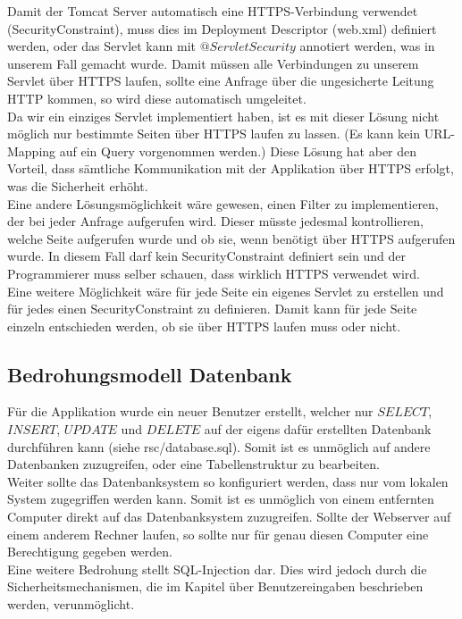 \documentclass[12pt]{scrartcl}
\begin{document}
Damit der Tomcat Server automatisch eine HTTPS-Verbindung verwendet (SecurityConstraint), muss dies im Deployment Descriptor (web.xml) definiert werden, oder das Servlet kann mit $@ServletSecurity$ annotiert werden, was in unserem Fall gemacht wurde. Damit müssen alle Verbindungen zu unserem Servlet über HTTPS laufen, sollte eine Anfrage über die ungesicherte Leitung HTTP kommen, so wird diese automatisch umgeleitet.\\
Da wir ein einziges Servlet implementiert haben, ist es mit dieser Lösung nicht möglich nur bestimmte Seiten über HTTPS laufen zu lassen. (Es kann kein URL-Mapping auf ein Query vorgenommen werden.) Diese Lösung hat aber den Vorteil, dass sämtliche Kommunikation mit der Applikation über HTTPS erfolgt, was die Sicherheit erhöht.\\
Eine andere Lösungsmöglichkeit wäre gewesen, einen Filter zu implementieren, der bei jeder Anfrage aufgerufen wird. Dieser müsste jedesmal kontrollieren, welche Seite aufgerufen wurde und ob sie, wenn benötigt über HTTPS aufgerufen wurde. In diesem Fall darf kein SecurityConstraint definiert sein und der Programmierer muss selber schauen, dass wirklich HTTPS verwendet wird.\\
Eine weitere Möglichkeit wäre für jede Seite ein eigenes Servlet zu erstellen und für jedes einen SecurityConstraint zu definieren. Damit kann für jede Seite einzeln entschieden werden, ob sie über HTTPS laufen muss oder nicht.

\subsection{Bedrohungsmodell Datenbank}
Für die Applikation wurde ein neuer Benutzer erstellt, welcher nur $SELECT$, $INSERT$, $UPDATE$ und $DELETE$ auf der eigens dafür erstellten Datenbank durchführen kann (siehe rsc/database.sql). Somit ist es unmöglich auf andere Datenbanken zuzugreifen, oder eine Tabellenstruktur zu bearbeiten.\\
Weiter sollte das Datenbanksystem so konfiguriert werden, dass nur vom lokalen System zugegriffen werden kann. Somit ist es unmöglich von einem entfernten Computer direkt auf das Datenbanksystem zuzugreifen. Sollte der Webserver auf einem anderem Rechner laufen, so sollte nur für genau diesen Computer eine Berechtigung gegeben werden.\\
Eine weitere Bedrohung stellt SQL-Injection dar. Dies wird jedoch durch die Sicherheitsmechanismen, die im Kapitel über Benutzereingaben beschrieben werden, verunmöglicht.
\end{document}
